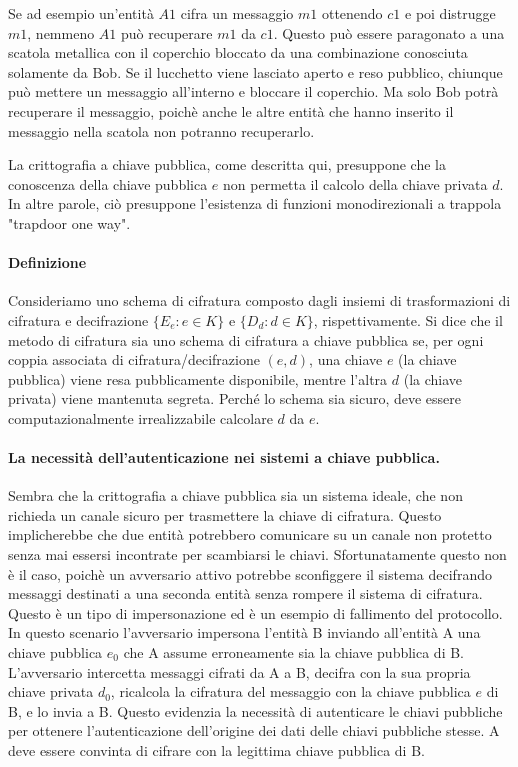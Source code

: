 \documentclass{article}
\newcounter{person}
\theoremstyle{definition}
\begin{document}
Se ad esempio un'entità $A1$ cifra un messaggio $m1$ ottenendo $c1$ e poi distrugge $m1$, nemmeno $A1$ può recuperare $m1$ da $c1$. Questo può essere paragonato a una scatola metallica con il coperchio bloccato da una combinazione conosciuta solamente da Bob. Se il lucchetto viene lasciato aperto e reso pubblico, chiunque può mettere un messaggio all'interno e bloccare il coperchio. Ma solo Bob potrà recuperare il messaggio, poichè anche le altre entità che hanno inserito il messaggio nella scatola non potranno recuperarlo.

La crittografia a chiave pubblica, come descritta qui, presuppone che la conoscenza della chiave pubblica \( e \) non permetta il calcolo della chiave privata \( d \). In altre parole, ciò presuppone l'esistenza di funzioni monodirezionali a trappola "trapdoor one way".

\paragraph{Definizione} Consideriamo uno schema di cifratura composto dagli insiemi di trasformazioni di cifratura e decifrazione \( \{ E_e : e \in K \} \) e \( \{ D_d : d \in K \} \), rispettivamente. Si dice che il metodo di cifratura sia uno schema di cifratura a chiave pubblica se, per ogni coppia associata di cifratura/decifrazione \( (e, d) \), una chiave \( e \) (la chiave pubblica) viene resa pubblicamente disponibile, mentre l'altra \( d \) (la chiave privata) viene mantenuta segreta. Perché lo schema sia sicuro, deve essere computazionalmente irrealizzabile calcolare \( d \) da \( e \).

\paragraph{La necessità dell'autenticazione nei sistemi a chiave pubblica.}
Sembra che la crittografia a chiave pubblica sia un sistema ideale, che non richieda un canale sicuro per trasmettere la chiave di cifratura. Questo implicherebbe che due entità potrebbero comunicare su un canale non protetto senza mai essersi incontrate per scambiarsi le chiavi. Sfortunatamente questo non è il caso, poichè un avversario attivo potrebbe sconfiggere il sistema decifrando messaggi destinati a una seconda entità senza rompere il sistema di cifratura. Questo è un tipo di impersonazione ed è un esempio di fallimento del protocollo. In questo scenario l'avversario impersona l'entità B inviando all'entità A una chiave pubblica \( e_0 \) che A assume erroneamente sia la chiave pubblica di B. L'avversario intercetta messaggi cifrati da A a B, decifra con la sua propria chiave privata \( d_0 \), ricalcola la cifratura del messaggio con la chiave pubblica  \( e \) di B, e lo invia a B. Questo evidenzia la necessità di autenticare le chiavi pubbliche per ottenere l'autenticazione dell'origine dei dati delle chiavi pubbliche stesse. A deve essere convinta di cifrare con la legittima chiave pubblica di B.
\end{document}
